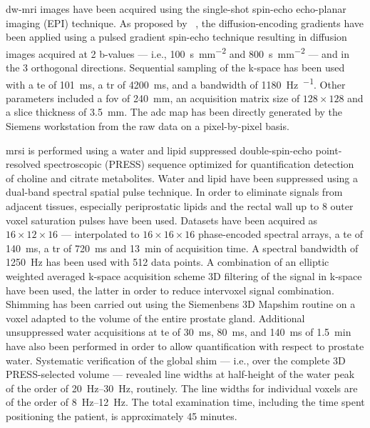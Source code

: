 \ac{dw}-\ac{mri} images have been acquired using the single-shot spin-echo echo-planar imaging (EPI) technique.
As proposed by \citeauthor{stejskal1965spin}~\cite{stejskal1965spin}, the diffusion-encoding gradients have been applied using a pulsed gradient spin-echo technique resulting in diffusion images acquired at 2 b-values --- i.e., \SI{100}{\second\per\milli\meter\squared} and \SI{800}{\second\per\milli\meter\squared} --- and in the 3 orthogonal directions.
Sequential sampling of the k-space has been used with a \ac{te} of \SI{101}{\ms}, a \ac{tr} of \SI{4200}{\ms}, and a bandwidth of \SI{1180}{\hertz\per\px}.
Other parameters included a \ac{fov} of \SI{240}{\milli\metre}, an acquisition matrix size of $128 \times 128$ and a slice thickness of \SI{3.5}{\milli\metre}.
The \ac{adc} map has been directly generated by the Siemens workstation from the raw data on a pixel-by-pixel basis.

\ac{mrsi} is performed using a water and lipid suppressed double-spin-echo point-resolved spectroscopic (PRESS) sequence optimized for quantification detection of choline and citrate metabolites.
Water and lipid have been suppressed using a dual-band spectral spatial pulse technique.
In order to eliminate signals from adjacent tissues, especially periprostatic lipids and the rectal wall up to 8 outer voxel saturation pulses have been used.
Datasets have been acquired as $16 \times 12 \times 16$ --- interpolated to $16 \times 16 \times 16$ phase-encoded spectral arrays, a \ac{te} of \SI{140}{\ms}, a \ac{tr} of \SI{720}{\ms} and \SI{13}{\minute} of acquisition time.
A spectral bandwidth of \SI{1250}{\hertz} has been used with 512 data points.
A combination of an elliptic weighted averaged k-space acquisition scheme 3D filtering of the signal in k-space have been used, the latter in order to reduce intervoxel signal combination.
Shimming has been carried out using the Siemenbens 3D Mapshim routine on a voxel adapted to the volume of the entire prostate gland.
Additional unsuppressed water acquisitions at \ac{te} of \SI{30}{\ms}, \SI{80}{\ms}, and \SI{140}{\ms} of \SI{1.5}{\minute} have also been performed in order to allow quantification with respect to prostate water.
Systematic verification of the global shim --- i.e., over the complete 3D PRESS-selected volume --- revealed line widths at half-height of the water peak of the order of \SIrange{20}{30}{\hertz}, routinely.
The line widths for individual voxels are of the order of \SIrange{8}{12}{\hertz}.
The total examination time, including the time spent positioning the patient, is approximately 45 minutes.


